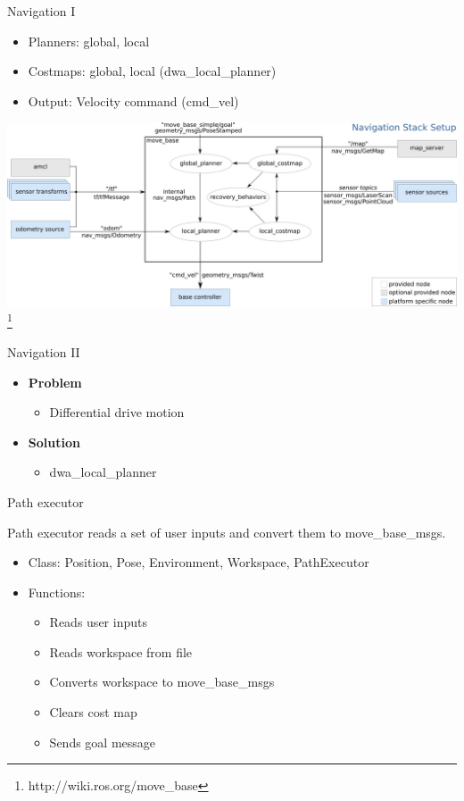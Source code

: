\begin{frame}{Navigation I}
\begin{itemize}
	\item Planners: global, local
	\item Costmaps: global, local (dwa\_local\_planner)
	\item Output: Velocity command (cmd\_vel)
\end{itemize}
\centering
    \includegraphics[scale=0.26]{gfx/nav.png}
\footnote{http://wiki.ros.org/move\_base}
\end{frame}
\begin{frame}{Navigation II}
\begin{itemize}
	\item \textbf{Problem}
		\begin{itemize}
			\item Differential drive motion
		\end{itemize}
	\item \textbf{Solution}
		\begin{itemize}
			\item dwa\_local\_planner
		\end{itemize}
\end{itemize}
\end{frame}
\begin{frame}{Path executor}
    
    Path executor reads  a set of user inputs and convert them to move\_base\_msgs.
    \begin{itemize}
        \item Class: Position, Pose, Environment, Workspace, PathExecutor
        
        \item Functions:
        \begin{itemize}
        	\item Reads user inputs
        	\item Reads workspace from file
            \item Converts workspace to move\_base\_msgs
            \item Clears cost map
            \item Sends goal message
        \end{itemize}
    \end{itemize}
    
\end{frame}

